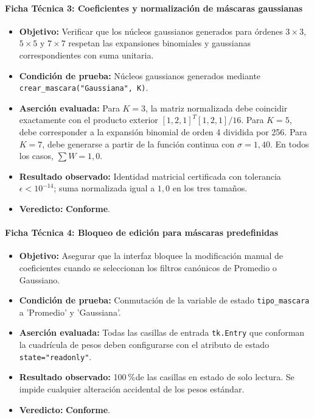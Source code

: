 \documentclass[11pt]{article}
\newcommand{\pct}{\ensuremath{\mathrm{\char37}}}
\newcommand{\pruebaok}{\textcolor{verdeExito}{\textbf{Conforme}}}
\begin{document}
\paragraph{Ficha Técnica 3: Coeficientes y normalización de máscaras gaussianas}
\begin{itemize}[itemsep=0.15em]
\item \textbf{Objetivo:} Verificar que los núcleos gaussianos generados para órdenes $3\times3$, $5\times5$ y $7\times7$ respetan las expansiones binomiales y gaussianas correspondientes con suma unitaria.
\item \textbf{Condición de prueba:} Núcleos gaussianos generados mediante \texttt{crear\_mascara("Gaussiana", K)}.
\item \textbf{Aserción evaluada:} Para $K=3$, la matriz normalizada debe coincidir exactamente con el producto exterior $[1, 2, 1]^T [1, 2, 1] / 16$. Para $K=5$, debe corresponder a la expansión binomial de orden 4 dividida por 256. Para $K=7$, debe generarse a partir de la función continua con $\sigma=1,40$. En todos los casos, $\sum W = 1,0$.
\item \textbf{Resultado observado:} Identidad matricial certificada con tolerancia $\epsilon < 10^{-14}$; suma normalizada igual a $1,0$ en los tres tamaños.
\item \textbf{Veredicto:} \pruebaok.
\end{itemize}

\paragraph{Ficha Técnica 4: Bloqueo de edición para máscaras predefinidas}
\begin{itemize}[itemsep=0.15em]
\item \textbf{Objetivo:} Asegurar que la interfaz bloquee la modificación manual de coeficientes cuando se seleccionan los filtros canónicos de Promedio o Gaussiano.
\item \textbf{Condición de prueba:} Conmutación de la variable de estado \texttt{tipo\_mascara} a 'Promedio' y 'Gaussiana'.
\item \textbf{Aserción evaluada:} Todas las casillas de entrada \texttt{tk.Entry} que conforman la cuadrícula de pesos deben configurarse con el atributo de estado \texttt{state="readonly"}.
\item \textbf{Resultado observado:} 100\,\pct de las casillas en estado de solo lectura. Se impide cualquier alteración accidental de los pesos estándar.
\item \textbf{Veredicto:} \pruebaok.
\end{itemize}
\end{document}
